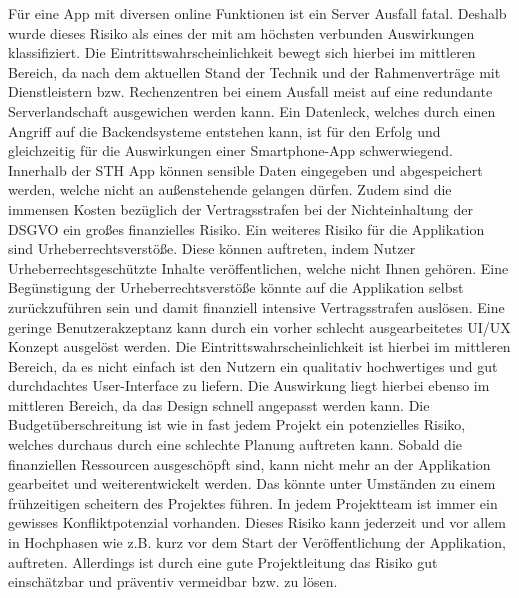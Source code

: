 Für eine App mit diversen online Funktionen ist ein Server Ausfall fatal. Deshalb wurde dieses Risiko als eines der mit am höchsten verbunden Auswirkungen klassifiziert. Die Eintrittswahrscheinlichkeit bewegt sich hierbei im mittleren Bereich, da nach dem aktuellen Stand der Technik und der Rahmenverträge mit Dienstleistern bzw. Rechenzentren bei einem Ausfall meist auf eine redundante Serverlandschaft ausgewichen werden kann. Ein Datenleck, welches durch einen Angriff auf die Backendsysteme entstehen kann, ist für den Erfolg und gleichzeitig für die Auswirkungen einer Smartphone-App schwerwiegend. Innerhalb der STH App können sensible Daten eingegeben und abgespeichert werden, welche nicht an außenstehende gelangen dürfen. Zudem sind die immensen Kosten bezüglich der Vertragsstrafen bei der Nichteinhaltung der DSGVO ein großes finanzielles Risiko. Ein weiteres Risiko für die Applikation sind Urheberrechtsverstöße. Diese können auftreten, indem Nutzer Urheberrechtsgeschützte Inhalte veröffentlichen, welche nicht Ihnen gehören. Eine Begünstigung der Urheberrechtsverstöße könnte auf die Applikation selbst zurückzuführen sein und damit finanziell intensive Vertragsstrafen auslösen. Eine geringe Benutzerakzeptanz kann durch ein vorher schlecht ausgearbeitetes UI/UX Konzept ausgelöst werden. Die Eintrittswahrscheinlichkeit ist hierbei im mittleren Bereich, da es nicht einfach ist den Nutzern ein qualitativ hochwertiges und gut durchdachtes User-Interface zu liefern. Die Auswirkung liegt hierbei ebenso im mittleren Bereich, da das Design schnell angepasst werden kann. Die Budgetüberschreitung ist wie in fast jedem Projekt ein potenzielles Risiko, welches durchaus durch eine schlechte Planung auftreten kann. Sobald die finanziellen Ressourcen ausgeschöpft sind, kann nicht mehr an der Applikation gearbeitet und weiterentwickelt werden. Das könnte unter Umständen zu einem frühzeitigen scheitern des Projektes führen. In jedem Projektteam ist immer ein gewisses Konfliktpotenzial vorhanden. Dieses Risiko kann jederzeit und vor allem in Hochphasen wie z.B. kurz vor dem Start der Veröffentlichung der Applikation, auftreten. Allerdings ist durch eine gute Projektleitung das Risiko gut einschätzbar und präventiv vermeidbar bzw. zu lösen.


